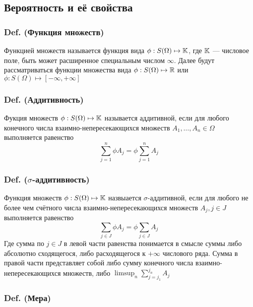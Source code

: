 \subsection{Вероятность и её
свойства}\label{ux432ux435ux440ux43eux44fux442ux43dux43eux441ux442ux44c-ux438-ux435ux451-ux441ux432ux43eux439ux441ux442ux432ux430}

\subsubsection{Def. (Функция
множеств)}\label{def.-ux444ux443ux43dux43aux446ux438ux44f-ux43cux43dux43eux436ux435ux441ux442ux432}

Функцией множеств называется функция вида
\(\phi : S(\Omega)\mapsto\mathbb K\), где \(\mathbb K\) --- числовое поле, быть
может расширенное специальным числом \(\infty\). Далее будут
рассматриваться функции множества вида \(\phi : S(\Omega)\mapsto\mathbb R\)
или \(\phi : S(\Omega)\mapsto [-\infty,+\infty]\)

\subsubsection{Def.
(Аддитивность)}\label{def.-ux430ux434ux434ux438ux442ux438ux432ux43dux43eux441ux442ux44c}

Фукция множеств \(\phi : S(\Omega)\mapsto\mathbb K\) называется аддитивной,
если для любого конечного числа взаимно-непересекающихся множеств
\(A_{1}, \ldots, A_n \in \Omega\) выполняется равенство
\[ \sum_{j=1}^n \phi A_j = \phi \sum_{j=1}^n A_j \]

\subsubsection{\texorpdfstring{Def.
(\(\sigma\)-аддитивность)}{Def. (\textbackslash{}sigma-аддитивность)}}\label{def.-sigma-ux430ux434ux434ux438ux442ux438ux432ux43dux43eux441ux442ux44c}

Функция множеств \(\phi : S(\Omega)\mapsto\mathbb K\) назвыается
\(\sigma\)-аддитивной, если для любого не более чем счётного числа
взаимно-непересекающихся множеств \(A_{j}, j\in J\) выполняется
равенство \[ \sum_{j\in J} \phi A_{j} = \phi \sum_{j\in J} A_{j} \] Где
сумма по \(j\in J\) в левой части равенства понимается в смысле суммы
либо абсолютно сходящегося, либо расходящегося к \(+\infty\) числового
ряда. Сумма в правой части представляет собой либо сумму конечного числа
взаимно-непересекающихся множеств, либо
\(\limsup_n \sum_{j=j_1}^{j_n} A_j\)

\subsubsection{Def. (Мера)}\label{def.-ux43cux435ux440ux430}

